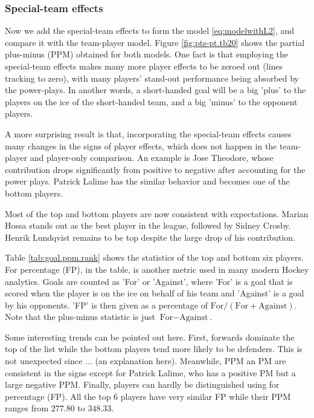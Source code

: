\subsubsection{Special-team effects}
Now we add the special-team effects to form the model \eqref{eq:modelwithL2}, and compare it with the team-player model. Figure \ref{fig:pts-pt.tb20} shows the partial plus-minus (PPM) obtained for both models. One fact is that employing the special-team effects makes many more player effects to be zeroed out (lines tracking to zero), with many players' stand-out performance being absorbed by the power-plays. In another words, a short-handed goal will be a big 'plus' to the players on the ice of the short-handed team, and a big 'minus' to the opponent players. 

A more surprising result is that, incorporating the special-team effects causes many changes in the signs of player effects, which does not happen in the team-player and player-only comparison. An example is Jose Theodore, whose contribution drops significantly from positive to negative after accounting for the power plays. Patrick Lalime has the similar behavior and becomes one of the bottom players.

Most of the top and bottom players are now consistent with expectations. Marian Hossa stands out as the best player in the league, followed by Sidney Crosby. Henrik Lundqvist remains to be top despite the large drop of his contribution. 

Table \ref{tab:goal.ppm.rank} shows the statistics of the top and bottom six players. For percentage (FP), in the table, is another metric used in many modern Hockey analytics. Goals are counted as 'For' or 'Against', where 'For' is a goal that is scored when the player is on the ice on behalf of his team and 'Against' is a goal by his opponents. 'FP' is then given as a percentage of $\text{For}/(\text{For}+\text{Against})$. Note that the plus-minus statistic is just $\text{For}-\text{Against}$. 

Some interesting trends can be pointed out here. First, forwards dominate the top of the list while the bottom players tend more likely to be defenders. This is not unexpected since ... (an explanation here). Meanwhile, PPM an PM are consistent in the signs except for Patrick Lalime, who has a positive PM but a large negative PPM. Finally, players can hardly be distinguished using for percentage (FP). All the top 6 players have very similar FP while their PPM ranges from $277.80$ to $348.33$. 

